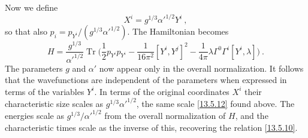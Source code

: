 Now we define
\begin{equation}
	X^i = g^{1/3}\alpha'^{1/2}Y^i \:, \label{13.5.16}
\end{equation}
so that also $p_i = p_{Y^i}/(g^{1/3}\alpha'^{1/2})$. The Hamiltonian becomes
\begin{equation}
	H = \frac{g^{1/3}}{\alpha'^{1/2}}\operatorname{Tr}\biggl(\frac{1}{2}p_{Y^i}p_{Y^i} - \frac{1}{16\pi^2}[Y^i,Y^j]^2 - \frac{1}{4\pi}\lambda\Gamma^0\Gamma^i[Y^i,\lambda]\biggr) \:. \label{13.5.17}
\end{equation}
The parameters $g$ and $\alpha'$ now appear only in the overall normalization. It follows that the wavefunctions are independent of the parameters when expressed in terms of the variables $Y^i$. In terms of the original coordinates $X^i$ their characteristic size scales as $g^{1/3}\alpha'^{1/2}$, the same scale \eqref{13.5.12} found above. The energies scale as $g^{1/3}/\alpha'^{1/2}$ from the overall normalization of $H$, and the characteristic times scale as the inverse of this, recovering the relation \eqref{13.5.10}.
